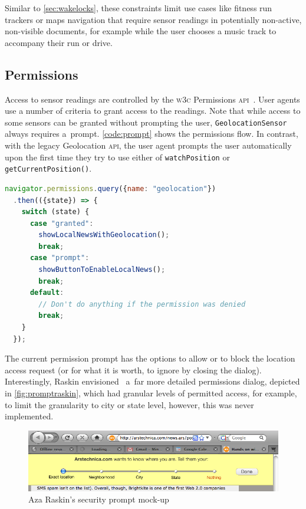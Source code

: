 \documentclass[sigconf,hyphens]{acmart}
\begin{document}
Similar to \autoref{sec:wakelocks}, these constraints limit use cases like fitness run trackers
or maps navigation that require sensor readings in potentially non-active, non-visible documents,
for example while the user chooses a music track to accompany their run or drive.

\subsection{Permissions}

Access to sensor readings are controlled by the \textsc{w3c} Permissions
\textsc{api}~\cite{lamouri2017permissions}.
User agents use a number of criteria to grant access to the readings.
Note that while access to some sensors can be granted without prompting the user,
\texttt{GeolocationSensor} always requires a~prompt.
\autoref{code:prompt} shows the permissions flow.
In contrast, with the legacy Geolocation \textsc{api}, the user agent prompts the user automatically
upon the first time they try to use either of \texttt{watchPosition} or \texttt{getCurrentPosition()}.

\begin{lstlisting}[caption={Asking for permission to use \texttt{GeolocationSensor}},
  label=code:prompt, language=JavaScript, float=h] 
navigator.permissions.query({name: "geolocation"})
  .then(({state}) => {
    switch (state) {
      case "granted":
        showLocalNewsWithGeolocation();
        break;
      case "prompt":
        showButtonToEnableLocalNews();
        break;
      default:
        // Don't do anything if the permission was denied
        break;
    }
  });
\end{lstlisting}

The current permission prompt has the options to allow or to block
the location access request (or for what it is worth, to ignore by closing the dialog).
Interestingly, Raskin envisioned~\cite{raskin2010geolocation} a~far more detailed permissions
dialog, depicted in \autoref{fig:promptraskin}, which had granular levels of permitted access,
for example, to limit the granularity to city or state level,
however, this was never implemented.

\begin{figure}[h]
  \includegraphics[width=\columnwidth]{mockup-prompt.png}
  \caption{Aza Raskin's security prompt mock-up~\cite{raskin2010geolocation}}
  \label{fig:promptraskin}
\end{figure}
\end{document}
